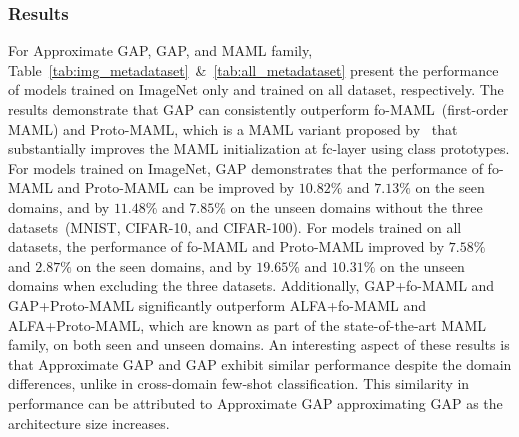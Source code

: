 \subsubsection{Results}
For Approximate GAP, GAP, and MAML family, Table~\ref{tab:img_metadataset}~\&~\ref{tab:all_metadataset} present the performance of models trained on ImageNet only and trained on all dataset, respectively. 
The results demonstrate that GAP can consistently outperform fo-MAML~(first-order MAML) and Proto-MAML, which is a MAML variant proposed by~\cite{triantafillou2019meta} that substantially improves the MAML initialization at fc-layer using class prototypes. 
For models trained on ImageNet, GAP demonstrates that the performance of fo-MAML and Proto-MAML can be improved by $10.82\%$ and $7.13\%$ on the seen domains, and by $11.48\%$ and $7.85\%$ on the unseen domains without the three datasets~(MNIST, CIFAR-10, and CIFAR-100).
For models trained on all datasets, the performance of fo-MAML and Proto-MAML improved by $7.58\%$ and $2.87\%$ on the seen domains, and by $19.65\%$ and $10.31\%$ on the unseen domains when excluding the three datasets. 
Additionally, GAP+fo-MAML and GAP+Proto-MAML significantly outperform ALFA+fo-MAML and ALFA+Proto-MAML, which are known as part of the state-of-the-art MAML family, on both seen and unseen domains. 
An interesting aspect of these results is that Approximate GAP and GAP exhibit similar performance despite the domain differences, unlike in cross-domain few-shot classification. 
This similarity in performance can be attributed to Approximate GAP approximating GAP as the architecture size increases.

